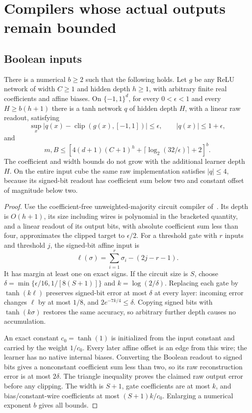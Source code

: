 \section{Compilers whose actual outputs remain bounded}
\subsection{Boolean inputs}
\begin{lemma}\label{lem:raw-Boolean-tanh}
There is a numerical $b\ge2$ such that the following holds.  Let $g$ be any
ReLU network of width $C\ge1$ and hidden depth $h\ge1$, with arbitrary
finite real coefficients and affine biases.  On $\{-1,1\}^d$, for every
$0<\epsilon<1$ and every $H\ge b(h+1)$ there is a tanh network $q$ of
hidden depth $H$, with a linear raw readout, satisfying
\[
 \sup_x|q(x)-\operatorname{clip}(g(x),[-1,1])|\le\epsilon,
 \qquad |q(x)|\le1+\epsilon,
\]
and
\[
 m,B\le\left[4(d+1)(C+1)^h
              +\lceil\log_2(32/\epsilon)\rceil+2\right]^b.
\]
The coefficient and width bounds do not grow with the additional learner
depth $H$.  On the entire input cube the same raw implementation satisfies
$|q|\le4$, because its signed-bit readout has coefficient sum below two
and constant offset of magnitude below two.
\end{lemma}
\begin{proof}
Use the coefficient-free unweighted-majority circuit compiler of~\cite{boolean}.  Its depth
is $O(h+1)$, its size including wires is polynomial in the bracketed
quantity, and a linear readout of its output bits, with absolute
coefficient sum less than four, approximates the clipped target to
$\epsilon/2$.  For a threshold gate with $r$ inputs and threshold $j$,
the signed-bit affine input is
\[
 \ell(\sigma)=\sum_{i=1}^r\sigma_i-(2j-r-1).
\]
It has margin at least one on exact signs.  If the circuit size is $S$,
choose $\delta=\min\{\epsilon/16,1/[8(S+1)]\}$ and
$k=\log(2/\delta)$.  Replacing each gate by $\tanh(k\ell)$ preserves
signed-bit error at most $\delta$ at every layer: incoming error changes
$\ell$ by at most $1/8$, and $2e^{-7k/4}\le\delta$.
Copying signed bits with $\tanh(k\sigma)$ restores the same accuracy, so
arbitrary further depth causes no accumulation.

An exact constant $c_0=\tanh(1)$ is initialized from the input
constant and carried by the weight $1/c_0$. Every later affine offset
is an edge from this wire; the learner has no native internal biases.
Converting the Boolean readout to signed bits gives a nonconstant
coefficient sum less than two, so its raw reconstruction error is at
most $2\delta$.  The triangle inequality proves the claimed raw output
error before any clipping.  The width is $S+1$, gate coefficients are
at most $k$, and bias/constant-wire coefficients at most $(S+1)k/c_0$.
Enlarging a numerical exponent $b$ gives all bounds.
\end{proof}

